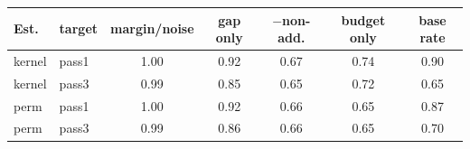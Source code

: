 \begin{tabular}{llccccc}
\toprule
Est. & target & margin/noise & gap only & $-$non-add. & budget only & base rate\\
\midrule
kernel & pass1 & 1.00 & 0.92 & 0.67 & 0.74 & 0.90\\
kernel & pass3 & 0.99 & 0.85 & 0.65 & 0.72 & 0.65\\
perm & pass1 & 1.00 & 0.92 & 0.66 & 0.65 & 0.87\\
perm & pass3 & 0.99 & 0.86 & 0.66 & 0.65 & 0.70\\
\bottomrule
\end{tabular}
